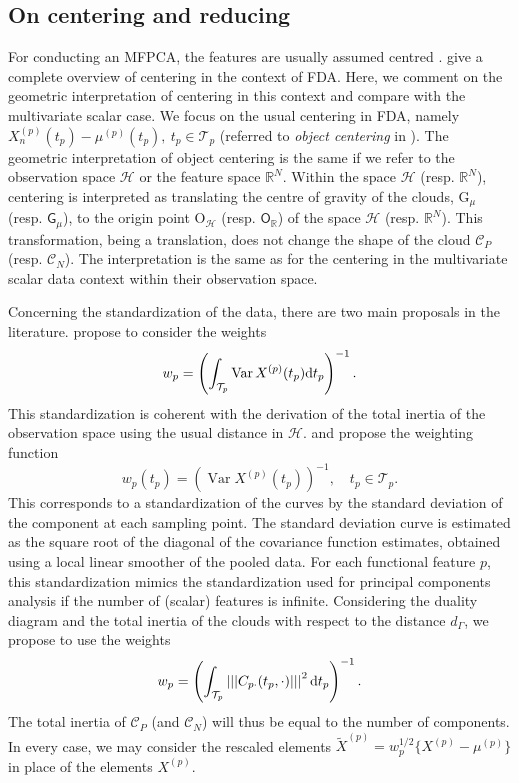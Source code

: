 \documentclass[times,sort&compress,3p]{elsarticle}
\theoremstyle{plain}%
\theoremstyle{definition}
\newcommand{\RR}{\mathbb{R}} %
\newcommand{\dd}{{\rm d}}
\newcommand{\TT}[1]{\mathcal{T}_{#1}} %
\newcommand{\HH}{\mathcal{H}} %
\newcommand{\normH}[1]{\left|\left|\left|#1\right|\right|\right|}
\newcommand{\Xnp}{X_n^{(p)}} %
\newcommand{\mup}[1]{\mu^{(#1)}} %
\newcommand{\pobs}[1]{\mathrm{#1}} %
\newcommand{\CN}{\mathcal{C}_{\!N}} %
\newcommand{\Gmu}{\pobs{G}_{\!\mu}} %
\newcommand{\OH}{\pobs{O}_{\!\mathcal{H}}} %
\newcommand{\pfea}[1]{\mathsf{#1}} %
\newcommand{\CP}{\mathcal{C}_{\!P}} %
\newcommand{\Gfea}{\pfea{G}_{\!\mu}} %
\newcommand{\OG}{\pfea{O}_{\!\RR}} %
\DeclareMathOperator{\Var}{Var}
\begin{document}
\subsection{On centering and reducing} %
\label{sub:on_centering_and_reducing}

For conducting an MFPCA, the features are usually assumed centred \citep{happMultivariateFunctionalPrincipal2018a}. \citet{protheroNewPerspectivesCentering2023} give a complete overview of centering in the context of FDA. Here, we comment on the geometric interpretation of centering in this context and compare with the multivariate scalar case. We focus on the usual centering in FDA, namely $\Xnp(t_p) - \mu^{(p)}(t_p),~t_p \in \TT{p}$ (referred to \emph{object centering} in \cite{protheroNewPerspectivesCentering2023}).
The geometric interpretation of object centering is the same if we refer to the observation space $\HH$ or the feature space $\RR^N$. Within the space $\HH$ (resp. $\RR^N$), centering is interpreted as translating the centre of gravity of the clouds, $\Gmu$ (resp. $\Gfea$), to the origin point $\OH$ (resp. $\OG$) of the space $\HH$ (resp. $\RR^N$). This transformation, being a translation, does not change the shape of the cloud $\CP$ (resp. $\CN$). The interpretation is the same as for the centering in the multivariate scalar data context within their observation space.

Concerning the standardization of the data, there are two main proposals in the literature. \citet{happMultivariateFunctionalPrincipal2018a} propose to consider the weights
\begin{equation}
w_p = \left(\int_{\TT{p}} \Var X^{(p)}(t_p) \dd t_p\right)^{-1}.
\end{equation}
This standardization is coherent with the derivation of the total inertia of the observation space using the usual distance in $\HH$. \citet{chiouMultivariateFunctionalPrincipal2014} and \citet{jacquesModelbasedClusteringMultivariate2014a} propose the weighting function
\begin{equation}
w_p(t_p) = \left(\Var X^{(p)}(t_p)\right)^{-1}, \quad t_p \in \TT{p}.
\end{equation}
This corresponds to a standardization of the curves by the standard deviation of the component at each sampling point. The standard deviation curve is estimated as the square root of the diagonal of the covariance function estimates, obtained using a local linear smoother of the pooled data. For each functional feature $p$, this standardization mimics the standardization used for principal components analysis if the number of (scalar) features is infinite.
Considering the duality diagram and the total inertia of the clouds with respect to the distance $d_\Gamma$, we propose to use the weights
\begin{equation}
    w_p = \left(\int_{\TT{p}} \normH{C_{p \cdot}(t_p, \cdot)}^2 \dd t_p\right)^{-1}.
\end{equation}
The total inertia of $\CP$ (and $\CN$) will thus be equal to the number of components.
In every case, we may consider the rescaled elements $\widetilde{X}^{(p)} = w_p^{1/2}\{X^{(p)} - \mup{p}\}$ in place of the elements $X^{(p)}$.
\end{document}
